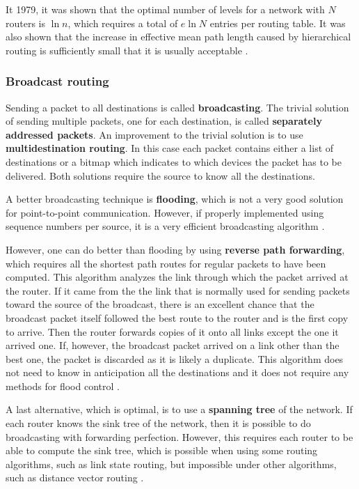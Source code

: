 It 1979, it was shown that the optimal number of levels for a network with \(N\) routers is \(\ln n\), which requires a total of \(e \ln N\) entries per routing table. It was also shown that the increase in effective mean path length caused by hierarchical routing is sufficiently small that it is usually acceptable \cite{kamoun-kleinrock-1976}.

\subsubsection{Broadcast routing}

Sending a packet to all destinations is called \textbf{broadcasting}.
The trivial solution of sending multiple packets, one for each destination, is called \textbf{separately addressed packets}.
An improvement to the trivial solution is to use \textbf{multidestination routing}.
In this case each packet contains either a list of destinations or a bitmap which indicates to which devices the packet has to be delivered. Both solutions require the source to know all the destinations.

A better broadcasting technique is \textbf{flooding}, which is not a very good solution for point-to-point communication. However, if properly implemented using sequence numbers per source, it is a very efficient broadcasting algorithm \cite[p.~381]{computer-networks-tanenbaum-2012}.

However, one can do better than flooding by using \textbf{reverse path forwarding}, which requires all the shortest path routes for regular packets to have been computed. This algorithm analyzes the link through which the packet arrived at the router. If it came from the the link that is normally used for sending packets toward the source of the broadcast, there is an excellent chance that the broadcast packet itself followed the best route to the router and is the first copy to arrive. Then the router forwards copies of it onto all links except the one it arrived one. If, however, the broadcast packet arrived on a link other than the best one, the packet is discarded as it is likely a duplicate. This algorithm does not need to know in anticipation all the destinations and it does not require any methods for flood control \cite[p.~381]{computer-networks-tanenbaum-2012}.

A last alternative, which is optimal, is to use a \textbf{spanning tree} of the network. If each router knows the sink tree of the network, then it is possible to do broadcasting with forwarding perfection. However, this requires each router to be able to compute the sink tree, which is possible when using some routing algorithms, such as link state routing, but impossible under other algorithms, such as distance vector routing \cite[p.~382]{computer-networks-tanenbaum-2012}.

